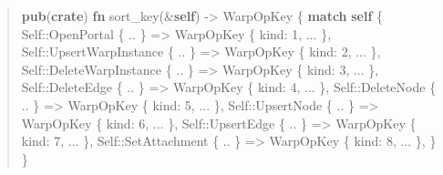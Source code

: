 \documentclass[11pt]{book}
\newenvironment{Shaded}{\begin{quote}}{\end{quote}}
\newcommand{\ControlFlowTok}[1]{\textcolor[rgb]{0.00,0.44,0.13}{\textbf{#1}}}
\newcommand{\DataTypeTok}[1]{\textcolor[rgb]{0.56,0.13,0.00}{#1}}
\newcommand{\DecValTok}[1]{\textcolor[rgb]{0.25,0.63,0.44}{#1}}
\newcommand{\KeywordTok}[1]{\textcolor[rgb]{0.00,0.44,0.13}{\textbf{#1}}}
\newcommand{\NormalTok}[1]{#1}
\newcommand{\OperatorTok}[1]{\textcolor[rgb]{0.40,0.40,0.40}{#1}}
\newcommand{\PreprocessorTok}[1]{\textcolor[rgb]{0.74,0.48,0.00}{#1}}
\begin{document}
\begin{Shaded}
\begin{Highlighting}[]
\KeywordTok{pub}\NormalTok{(}\KeywordTok{crate}\NormalTok{) }\KeywordTok{fn}\NormalTok{ sort\_key(}\OperatorTok{\&}\KeywordTok{self}\NormalTok{) }\OperatorTok{{-}\textgreater{}}\NormalTok{ WarpOpKey }\OperatorTok{\{}
    \ControlFlowTok{match} \KeywordTok{self} \OperatorTok{\{}
        \DataTypeTok{Self}\PreprocessorTok{::}\NormalTok{OpenPortal }\OperatorTok{\{} \OperatorTok{..} \OperatorTok{\}}        \OperatorTok{=\textgreater{}}\NormalTok{ WarpOpKey }\OperatorTok{\{}\NormalTok{ kind}\OperatorTok{:} \DecValTok{1}\OperatorTok{,} \OperatorTok{...} \OperatorTok{\},}
        \DataTypeTok{Self}\PreprocessorTok{::}\NormalTok{UpsertWarpInstance }\OperatorTok{\{} \OperatorTok{..} \OperatorTok{\}} \OperatorTok{=\textgreater{}}\NormalTok{ WarpOpKey }\OperatorTok{\{}\NormalTok{ kind}\OperatorTok{:} \DecValTok{2}\OperatorTok{,} \OperatorTok{...} \OperatorTok{\},}
        \DataTypeTok{Self}\PreprocessorTok{::}\NormalTok{DeleteWarpInstance }\OperatorTok{\{} \OperatorTok{..} \OperatorTok{\}} \OperatorTok{=\textgreater{}}\NormalTok{ WarpOpKey }\OperatorTok{\{}\NormalTok{ kind}\OperatorTok{:} \DecValTok{3}\OperatorTok{,} \OperatorTok{...} \OperatorTok{\},}
        \DataTypeTok{Self}\PreprocessorTok{::}\NormalTok{DeleteEdge }\OperatorTok{\{} \OperatorTok{..} \OperatorTok{\}}        \OperatorTok{=\textgreater{}}\NormalTok{ WarpOpKey }\OperatorTok{\{}\NormalTok{ kind}\OperatorTok{:} \DecValTok{4}\OperatorTok{,} \OperatorTok{...} \OperatorTok{\},}
        \DataTypeTok{Self}\PreprocessorTok{::}\NormalTok{DeleteNode }\OperatorTok{\{} \OperatorTok{..} \OperatorTok{\}}        \OperatorTok{=\textgreater{}}\NormalTok{ WarpOpKey }\OperatorTok{\{}\NormalTok{ kind}\OperatorTok{:} \DecValTok{5}\OperatorTok{,} \OperatorTok{...} \OperatorTok{\},}
        \DataTypeTok{Self}\PreprocessorTok{::}\NormalTok{UpsertNode }\OperatorTok{\{} \OperatorTok{..} \OperatorTok{\}}        \OperatorTok{=\textgreater{}}\NormalTok{ WarpOpKey }\OperatorTok{\{}\NormalTok{ kind}\OperatorTok{:} \DecValTok{6}\OperatorTok{,} \OperatorTok{...} \OperatorTok{\},}
        \DataTypeTok{Self}\PreprocessorTok{::}\NormalTok{UpsertEdge }\OperatorTok{\{} \OperatorTok{..} \OperatorTok{\}}        \OperatorTok{=\textgreater{}}\NormalTok{ WarpOpKey }\OperatorTok{\{}\NormalTok{ kind}\OperatorTok{:} \DecValTok{7}\OperatorTok{,} \OperatorTok{...} \OperatorTok{\},}
        \DataTypeTok{Self}\PreprocessorTok{::}\NormalTok{SetAttachment }\OperatorTok{\{} \OperatorTok{..} \OperatorTok{\}}     \OperatorTok{=\textgreater{}}\NormalTok{ WarpOpKey }\OperatorTok{\{}\NormalTok{ kind}\OperatorTok{:} \DecValTok{8}\OperatorTok{,} \OperatorTok{...} \OperatorTok{\},}
    \OperatorTok{\}}
\OperatorTok{\}}
\end{Highlighting}
\end{Shaded}
\end{document}

